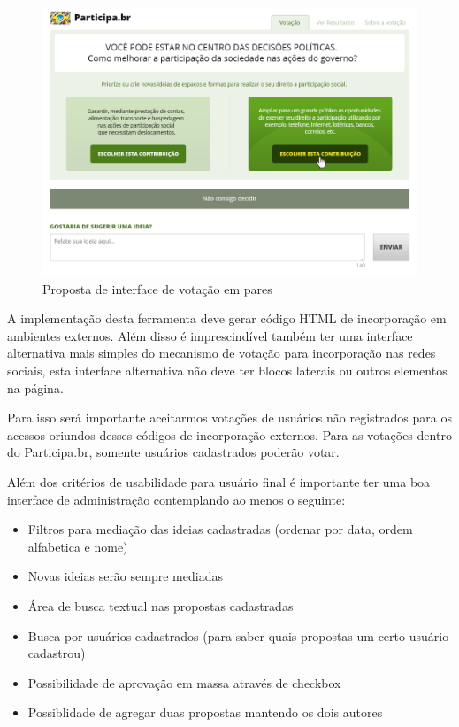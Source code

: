 \documentclass[12pt]{article}
\begin{document}
\begin{figure}[h]
\center
\includegraphics[scale=0.4]{design-votacao-em-pares-verde.png}
\caption{Proposta de interface de votação em pares}
\label{fig:pairwise}
\end{figure}

A implementação desta ferramenta deve gerar código HTML de incorporação em
ambientes externos. Além disso é imprescindível também ter uma interface
alternativa mais simples do mecanismo de votação para incorporação nas redes
sociais, esta interface alternativa não deve ter blocos laterais ou outros
elementos na página.

Para isso será importante aceitarmos votações de usuários não registrados para
os acessos oriundos desses códigos de incorporação externos. Para as votações
dentro do Participa.br, somente usuários cadastrados poderão votar.

Além dos critérios de usabilidade para usuário final é importante ter uma boa
interface de administração contemplando ao menos o seguinte:

\begin{itemize}
  \item Filtros para mediação das ideias cadastradas (ordenar por data, ordem
    alfabetica e nome)
  \item Novas ideias serão sempre mediadas
  \item Área de busca textual nas propostas cadastradas
  \item Busca por usuários cadastrados (para saber quais propostas
    um certo usuário cadastrou)
  \item Possibilidade de aprovação em massa através de checkbox
  \item Possiblidade de agregar duas propostas mantendo os dois autores
\end{itemize}
\end{document}
